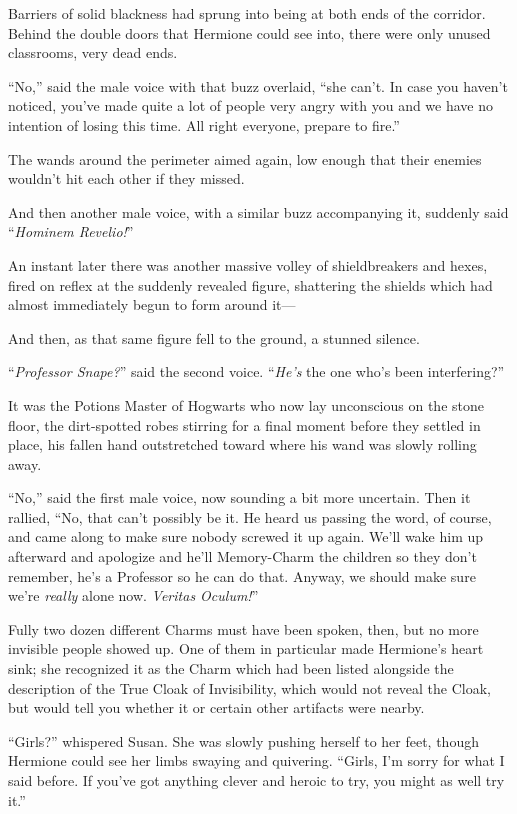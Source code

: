 Barriers of solid blackness had sprung into being at both ends of the corridor. Behind the double doors that Hermione could see into, there were only unused classrooms, very dead ends.

“No,” said the male voice with that buzz overlaid, “she can’t. In case you haven’t noticed, you’ve made quite a lot of people very angry with you and we have no intention of losing this time. All right everyone, prepare to fire.”

The wands around the perimeter aimed again, low enough that their enemies wouldn’t hit each other if they missed.

And then another male voice, with a similar buzz accompanying it, suddenly said “\emph{Hominem Revelio!}”

An instant later there was another massive volley of shieldbreakers and hexes, fired on reflex at the suddenly revealed figure, shattering the shields which had almost immediately begun to form around it—

And then, as that same figure fell to the ground, a stunned silence.

“\emph{Professor Snape?}” said the second voice. “\emph{He’s} the one who’s been interfering?”

It was the Potions Master of Hogwarts who now lay unconscious on the stone floor, the dirt-spotted robes stirring for a final moment before they settled in place, his fallen hand outstretched toward where his wand was slowly rolling away.

“No,” said the first male voice, now sounding a bit more uncertain. Then it rallied, “No, that can’t possibly be it. He heard us passing the word, of course, and came along to make sure nobody screwed it up again. We’ll wake him up afterward and apologize and he’ll Memory-Charm the children so they don’t remember, he’s a Professor so he can do that. Anyway, we should make sure we’re \emph{really} alone now. \emph{Veritas Oculum!}”

Fully two dozen different Charms must have been spoken, then, but no more invisible people showed up. One of them in particular made Hermione’s heart sink; she recognized it as the Charm which had been listed alongside the description of the True Cloak of Invisibility, which would not reveal the Cloak, but would tell you whether it or certain other artifacts were nearby.

“Girls?” whispered Susan. She was slowly pushing herself to her feet, though Hermione could see her limbs swaying and quivering. “Girls, I’m sorry for what I said before. If you’ve got anything clever and heroic to try, you might as well try it.”

